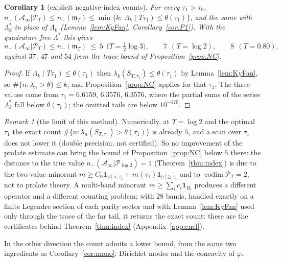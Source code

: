 \documentclass[11pt]{amsart}
\newtheorem{corollary}[theorem]{Corollary}
\theoremstyle{definition}
\theoremstyle{remark}
\newtheorem{remark}[theorem]{Remark}
\newcommand{\PT}{\mathcal P_T}
\newcommand{\Ainf}{\mathcal A_\infty}
\newcommand{\mT}{\mathfrak m_T}
\begin{document}
\begin{corollary}[explicit negative-index counts]\label{cor:P3}
For every $\tau_1>\tau_0$, $n_-(\Ainf|\PT)\le n_-(\mT)\le\min\{k:\
\Lambda_k(T\tau_1)\le\theta(\tau_1)\}$, and the same with $\Lambda^*_k$ in place of $\Lambda_k$
(Lemma~\ref{lem:KyFan}, Corollary~\ref{cor:P1}). With the quadrature-free $\Lambda^*$ this gives
\[
n_-(\Ainf|\PT)\le n_-(\mT)\ \le\ 5\ \ \big(T=\tfrac12\log3\big),\qquad 7\ \ (T=\log2),\qquad 8\ \ (T=0.80),
\]
against $37$, $47$ and $54$ from the trace bound of Proposition~\ref{prop:NC}.
\end{corollary}
\begin{proof}
If $\Lambda_k(T\tau_1)\le\theta(\tau_1)$ then $\lambda_k(S_{T,\tau_1})\le\theta(\tau_1)$ by
Lemma~\ref{lem:KyFan}, so $\#\{n:\lambda_n>\theta\}\le k$, and Proposition~\ref{prop:NC} applies for
that $\tau_1$. The three values come from $\tau_1=6.6159$, $6.3576$, $6.3576$, where the partial sums of
the series $\Lambda^*_k$ fall below $\theta(\tau_1)$; the omitted tails are below $10^{-170}$.
\end{proof}

\begin{remark}[the limit of this method]\label{rem:P4}
Numerically, at $T=\log2$ and the optimal $\tau_1$ the exact count
$\#\{n:\lambda_n(S_{T,\tau_1})>\theta(\tau_1)\}$ is already $5$, and a scan over $\tau_1$ does not
lower it (double precision, not certified). So no improvement of the prolate estimate can bring the
bound of Proposition~\ref{prop:NC} below $5$ there: the distance to the true value
$n_-(\Ainf|\mathcal P_{\log2})=1$ (Theorem~\ref{thm:index}) is due to the two-value minorant
$m\ge C_0\mathbf 1_{|\tau|<\tau_1}+m(\tau_1)\mathbf 1_{|\tau|\ge\tau_1}$ and to $\operatorname{codim}\PT=2$, not to
prolate theory. A multi-band minorant $m\ge\sum_ic_i\mathbf 1_{B_i}$ produces a different operator and a
different counting problem; with $28$ bands, handled exactly on a finite Legendre section of each parity
sector and with Lemma~\ref{lem:KyFan} used only through the trace of the far tail, it returns the exact
count: these are the certificates behind Theorem~\ref{thm:index} (Appendix~\ref{app:encl}).
\end{remark}

In the other direction the count admits a lower bound, from the same two ingredients as
Corollary~\ref{cor:mono}: Dirichlet modes and the concavity of $\varphi$.
\end{document}
